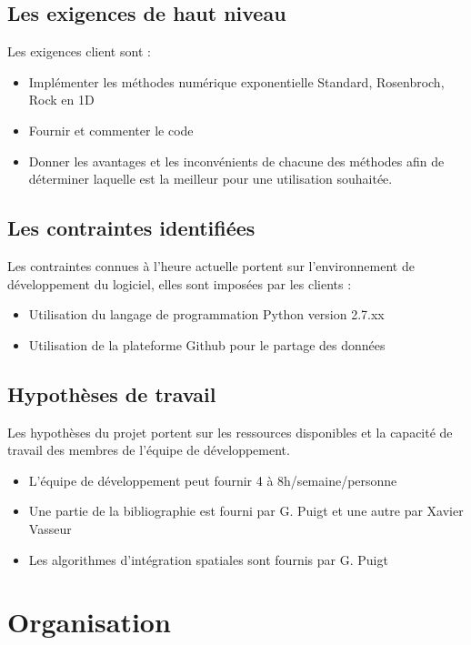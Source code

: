 \documentclass[a4paper,12pt]{report}
\theoremstyle{break}
\begin{document}
\section{Les exigences de haut niveau}
    Les exigences client sont :
   \begin{itemize}[label=\textbullet]
   	\item Implémenter les méthodes numérique exponentielle Standard, Rosenbroch, Rock en 1D
   	\item Fournir et commenter le code
   	\item Donner les avantages et les inconvénients de chacune des méthodes afin de déterminer laquelle est la meilleur pour une utilisation souhaitée.
    \end{itemize}

\section{Les contraintes identifiées}
    Les contraintes connues à l’heure actuelle portent sur l’environnement de développement du logiciel, elles sont imposées par les clients :
   \begin{itemize}[label=\textbullet]
   	\item Utilisation du langage de programmation Python version 2.7.xx
   	\item Utilisation de la plateforme Github pour le partage des données
    \end{itemize}

\section{Hypothèses de travail}
    Les hypothèses du projet portent sur les ressources disponibles et la capacité de travail des membres de l’équipe de développement.
   \begin{itemize}[label=\textbullet]
   	\item L’équipe de développement peut fournir 4 à 8h/semaine/personne
   	\item Une partie de la bibliographie est fourni par G. Puigt et une autre par Xavier Vasseur
   	\item  Les algorithmes d’intégration spatiales sont fournis par G. Puigt
    \end{itemize}


\chapter{Organisation}
\end{document}

